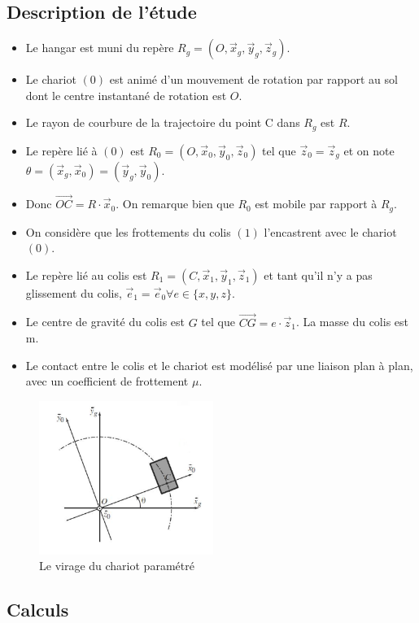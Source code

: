 \subsection{Description de l'étude}
\begin{itemize}
	\item Le hangar est muni du repère $R_g = (O,\vec x_g, \vec y_g, \vec z_g)$.
	\item Le chariot $(0)$ est animé d'un mouvement de rotation par rapport au sol dont le centre instantané de rotation est $O$.
	\item Le rayon de courbure de la trajectoire du point C dans $R_g$ est $R$.
	\item Le repère lié à $(0)$ est $R_0 = (O, \vec x_0, \vec y_0, \vec z_0)$ tel que $\vec z_0 = \vec z_g$ et on note $\theta = (\vec x_g, \vec x_0) = (\vec y_g, \vec y_0)$.
	\item Donc $\vec{OC} = R \cdot \vec x_0$. On remarque bien que $R_0$ est mobile par rapport à $R_g$.
	\item On considère que les frottements du colis $(1)$ l'encastrent avec le chariot $(0)$.
	\item Le repère lié au colis est $R_1 = (C, \vec x_1, \vec y_1, \vec z_1)$ et tant qu'il n'y a pas glissement du colis, $\vec e_1 = \vec e_0 \forall e \in \{x,y,z\}$.
	\item Le centre de gravité du colis est $G$ tel que $\vec{CG} = e\cdot\vec z_1$. La masse du colis est m.
	\item Le contact entre le colis et le chariot est modélisé par une liaison plan à plan, avec un coefficient de frottement $\mu$.
\end{itemize}
\begin{figure}
	\centering
	\includegraphics[height=5cm]{schema_chariot3}
	\caption{Le virage du chariot paramétré}
	\label{fig:schemaChariot3}
\end{figure}
\subsection{Calculs}
